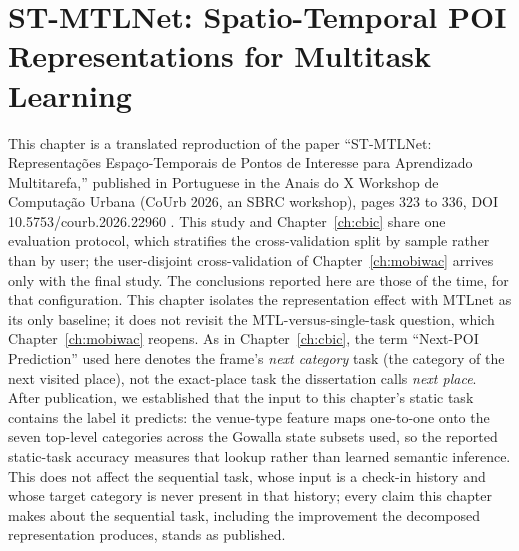 \chapter[ST-MTLNet: Spatio-Temporal POI Representations]{ST-MTLNet: Spatio-Temporal POI Representations for Multitask Learning}
\label{ch:courb}

\begin{chapterpreface}
This chapter is a translated reproduction of the paper ``ST-MTLNet: Representações Espaço-Temporais de Pontos de Interesse para Aprendizado Multitarefa,'' published in Portuguese in the Anais do X Workshop de Computação Urbana (CoUrb 2026, an SBRC workshop), pages 323 to 336, DOI 10.5753/courb.2026.22960 \cite{paiva2026stmtlnet}. This study and Chapter~\ref{ch:cbic} share one evaluation protocol, which stratifies the cross-validation split by sample rather than by user; the user-disjoint cross-validation of Chapter~\ref{ch:mobiwac} arrives only with the final study. The conclusions reported here are those of the time, for that configuration. This chapter isolates the representation effect with MTLnet as its only baseline; it does not revisit the MTL-versus-single-task question, which Chapter~\ref{ch:mobiwac} reopens. As in Chapter~\ref{ch:cbic}, the term ``Next-POI Prediction'' used here denotes the frame's \emph{next category} task (the category of the next visited place), not the exact-place task the dissertation calls \emph{next place}. After publication, we established that the input to this chapter's static task contains the label it predicts: the venue-type feature maps one-to-one onto the seven top-level categories across the Gowalla state subsets used, so the reported static-task accuracy measures that lookup rather than learned semantic inference. This does not affect the sequential task, whose input is a check-in history and whose target category is never present in that history; every claim this chapter makes about the sequential task, including the improvement the decomposed representation produces, stands as published.
\end{chapterpreface}






